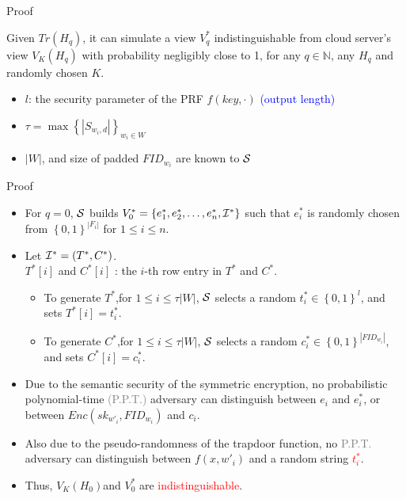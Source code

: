 \documentclass[handout]{beamer}
\begin{document}
\begin{frame}{Proof}
	\begin{definition}
		Given ${Tr({H_q})}$, it can simulate a view $V_q^*$ indistinguishable from cloud server's view ${V_K}({H_q})$ with probability negligibly close to 1, for any $q \in \mathbb{N}$, any ${H_q}$ and randomly chosen $K$.
	\end{definition}
	\begin{itemize}
		\item<2-> $l$: the security parameter of the PRF $f(key, \cdot )$ \textcolor{blue}{(output length)}
		\item<3->  $\tau  = \max {\left\{ {\left| {{S_{{w_i},d}}} \right|} \right\}_{{w_i} \in W}}$
		\item<4-> $\left| W \right|$, and size of padded ${FI{D_{{w_i}}}}$ are known to $\cal S$	
	\end{itemize}
\end{frame}

\begin{frame}{Proof}
	\begin{itemize}
	\item<1-> For $q=0$, $\cal S$ builds $V_0^* = \left\{ {e_1^*,e_2^*, \ldots ,e_n^*,{{\cal I}^*}} \right\}$ such that $e_i^*$ is randomly chosen from ${\left\{ {0,1} \right\}^{\left| {{F_i}} \right|}}$ for $1 \le i \le n$.
	\item<2-> Let ${{\cal I}^*} = ({T^*},{C^*})$.\\
	${T^*}[i]$ and ${C^*}[i]$ : the $i$-th row entry in ${T^*}$ and ${C^*}$.
	\begin{itemize}
		\item<3-> To generate ${T^*}$,for $1 \le i \le \tau \left| W \right|$, $\cal S$ selects a random $t_i^* \in {\left\{ {0,1} \right\}^l}$, and sets ${T^*}[i] = t_i^*$.
		\item<4-> To generate ${C^*}$,for $1 \le i \le \tau \left| W \right|$, $\cal S$ selects a random $c_i^* \in {\left\{ {0,1} \right\}^{\left| {FI{D_{{w_i}}}} \right|}}$, and sets ${C^*}[i] = c_i^*$.
	\end{itemize}
	\item<5-> Due to the semantic security of the symmetric encryption, no probabilistic polynomial-time \textcolor{grey}{(P.P.T.)} adversary can distinguish between ${e_i}$ and $e_i^*$, or between ${Enc(s{k_{w{'_i}}},FI{D_{{w_i}}})}$ and $c_i$.
	\item<6-> Also due to the pseudo-randomness of the trapdoor function, no \textcolor{grey}{P.P.T.} adversary can distinguish between $f(x,w{'_i})$ and a random string \textcolor{red}{$t_i^*$}.
	\item<7-> Thus, ${V_K}({H_0})$and $V_0^*$ are \textcolor{red}{indistinguishable}.
\end{itemize}
\end{frame}
\end{document}
